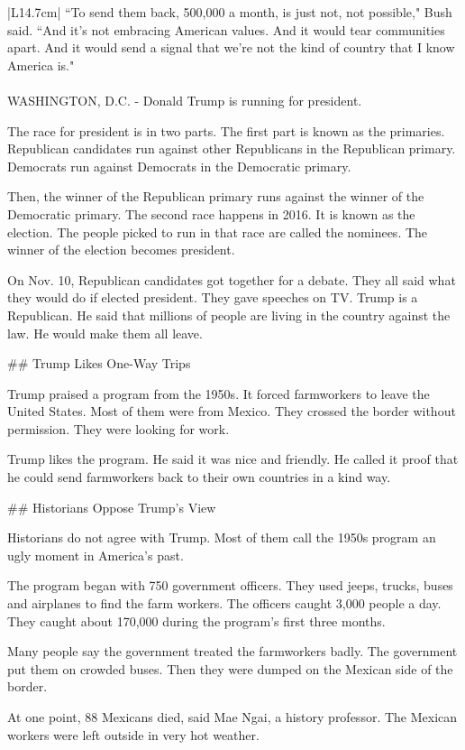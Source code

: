 \begin{table}
\begin{center}
\begin{tabular}{|L{14.7cm}|}
``To send them back, 500,000 a month, is just not, not possible," Bush said. ``And it's not embracing American values. And it would tear communities apart. And it would send a signal that we're not the kind of country that I know America is." \\ \hline \hline
{} \\ \hline 
\tiny WASHINGTON, D.C. - Donald Trump is running for president.

The race for president is in two parts. The first part is known as the primaries. Republican candidates run against other Republicans in the Republican primary. Democrats run against Democrats in the Democratic primary.

Then, the winner of the Republican primary runs against the winner of the Democratic primary. The second race happens in 2016. It is known as the election. The people picked to run in that race are called the nominees. The winner of the election becomes president.

On Nov. 10, Republican candidates got together for a debate. They all said what they would do if elected president. They gave speeches on TV. Trump is a Republican. He said that millions of people are living in the country against the law. He would make them all leave.

\#\# Trump Likes One-Way Trips

Trump praised a program from the 1950s. It forced farmworkers to leave the United States. Most of them were from Mexico. They crossed the border without permission. They were looking for work.

Trump likes the program. He said it was nice and friendly. He called it proof that he could send farmworkers back to their own countries in a kind way.

\#\# Historians Oppose Trump's View

Historians do not agree with Trump. Most of them call the 1950s program an ugly moment in America's past.

The program began with 750 government officers. They used jeeps, trucks, buses and airplanes to find the farm workers. The officers caught 3,000 people a day. They caught about 170,000 during the program's first three months.

Many people say the government treated the farmworkers badly. The government put them on crowded buses. Then they were dumped on the Mexican side of the border.

At one point, 88 Mexicans died, said Mae Ngai, a history professor. The Mexican workers were left outside in very hot weather.


\end{tabular}
\end{center}
\end{table}
